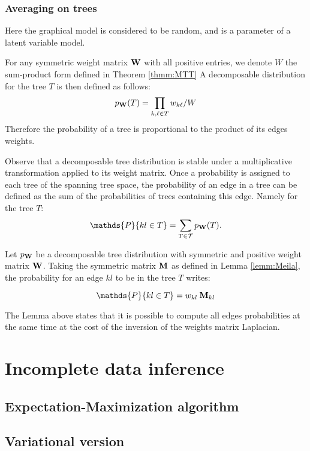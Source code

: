  \subsubsection{Averaging on trees}
 Here the graphical model is considered to be random, and is a  parameter of a latent variable model.
\begin{definition}
For any symmetric weight matrix ${\bf W}$ with all positive entries, we denote $W$ the sum-product form defined in Theorem \ref{thmm:MTT} A decomposable  distribution for the tree $T$ is then defined as follows:
$$p_{{\bf W}}(T) = \prod_{k,\ell \in T} w_{k\ell} / W $$
Therefore the probability of a tree is proportional to the product of its edges weights.
\end{definition}
Observe that a decomposable tree distribution is stable under a multiplicative transformation applied to its weight matrix. Once a probability is assigned to each tree of the spanning tree space, the probability of an edge in a tree can be defined as the sum of the probabilities of trees containing this edge. Namely for the tree $T$:
$$\mathds{P}\{kl\in T\} = \sum_{T\in \mathcal{T}} p_{\Wbf}(T).$$

\begin{lemma}  \label{lem:Kirshner}
    Let $p_{{\bf W}}$ be a decomposable tree distribution with symmetric and positive weight matrix ${\bf W}$. Taking the symmetric matrix ${\bf M}$ as defined in Lemma  \ref{lemm:Meila}, the probability for an edge $kl$ to be in the tree $T$ writes:
 
$$\mathds{P}\{kl\in T\} =  w_{kl}\: \Mbf_{kl}$$
\end{lemma}
The Lemma above states that it is possible to compute all edges probabilities at the same time at the cost of the inversion of the weights matrix Laplacian.
\section{Incomplete data inference}

 \subsection{Expectation-Maximization algorithm}
 
 \subsection{Variational version}
  